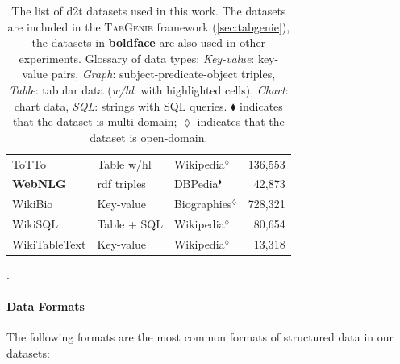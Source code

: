 {\begin{table}[t]
\begin{tabular}{@{}lllr@{}}
    ToTTo \cite{parikhToTToControlledTableToText2020}                                          & Table w/hl           & Wikipedia$^\lozenge$    & 136,553         \\
    \textbf{WebNLG} \cite{gardentWebNLGChallengeGenerating2017}                                & \acs{rdf} triples    & DBPedia$^\blacklozenge$ & 42,873          \\
    WikiBio \cite{lebretNeuralTextGeneration2016}                                              & Key-value            & Biographies$^\lozenge$  & 728,321         \\
    WikiSQL \cite{zhong2017seq2sql}                                                            & Table + SQL          & Wikipedia$^\lozenge$    & 80,654          \\
    WikiTableText \cite{bao2018table}                                                          & Key-value            & Wikipedia$^\lozenge$    & 13,318          \\
    \bottomrule
  \end{tabular}
  \caption{The list of \ac{d2t} datasets used in this work. The datasets are included in the \textsc{TabGenie} framework (\autoref{sec:tabgenie}), the datasets in \textbf{boldface} are also used in other experiments. Glossary of data types: \textit{Key-value}: key-value pairs, \textit{Graph}: subject-predicate-object triples, \textit{Table}: tabular data (\textit{w/hl}: with highlighted cells), \textit{Chart}: chart data, \textit{SQL}: strings with SQL queries. $\blacklozenge$ indicates that the dataset is multi-domain; $\lozenge$ indicates that the dataset is open-domain.}
  \label{tab:datasets}.
\end{table}

\paragraph{Data Formats} The following formats are the most common formats of structured data in our datasets:

}
